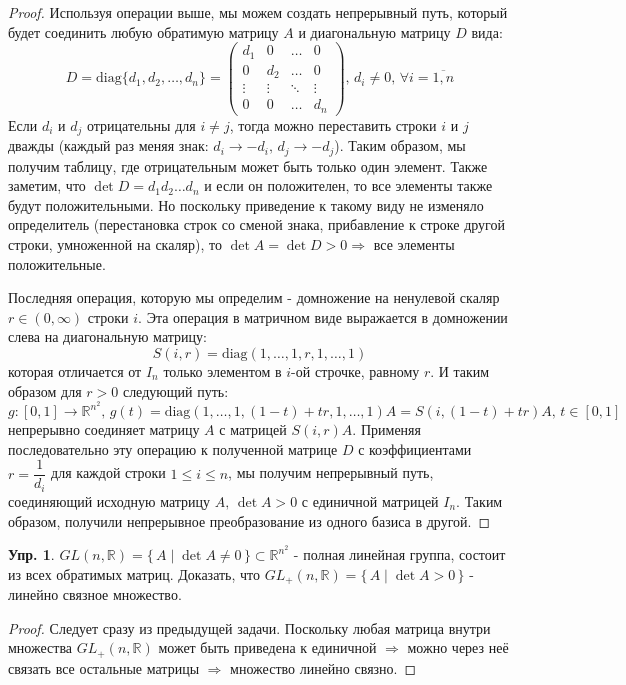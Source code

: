 \documentclass[12pt]{article}
\newcommand{\MR}{\mathbb{R}}
\theoremstyle{definition}
\newtheorem{exrc}{Упр.}
\begin{document}
\begin{proof}
	Используя операции выше, мы можем создать непрерывный путь, который будет соединить любую обратимую матрицу $A$ и диагональную матрицу $D$ вида:
	$$
		D = \text{diag}\{d_1,d_2, \dotsc, d_n\} = 
		\begin{pmatrix}
			d_1 & 0 & \dotsc & 0 \\
			0 & d_2 & \dotsc & 0\\
			\vdots & \vdots & \ddots & \vdots \\
			0 & 0 & \dotsc & d_n
		\end{pmatrix}, \, d_i \neq 0, \, \forall i = \overline{1,n}
	$$
	Если $d_i$ и $d_j$ отрицательны для $i \neq j$, тогда можно переставить строки $i$ и $j$ дважды (каждый раз меняя знак: $d_i \to -d_i, \, d_j \to - d_j$). Таким образом, мы получим таблицу, где отрицательным может быть только один элемент. Также заметим, что $\det{D} = d_1 d_2 \dotsc d_n$ и если он положителен, то все элементы также будут положительными. Но поскольку приведение к такому виду не изменяло определитель (перестановка строк со сменой знака, прибавление к строке другой строки, умноженной на скаляр), то $\det{A} = \det{D} > 0 \Rightarrow$ все элементы положительные.
	
	Последняя операция, которую мы определим - домножение на ненулевой скаляр $r \in (0,\infty)$ строки $i$. Эта операция в матричном виде выражается в домножении слева на диагональную матрицу:
	$$
		S(i,r) = \text{diag}(1,\dotsc,1,r,1,\dotsc,1)
	$$
	которая отличается от $I_n$ только элементом в $i$-ой строчке, равному $r$. И таким образом для $r > 0$ следующий путь:
	$$
		g \colon [0,1] \to \MR^{n^2}, \, g(t) = \text{diag}(1,\dotsc,1,(1-t) + tr,1,\dotsc,1)A = S(i,(1-t) + tr)A, \, t \in [0,1]
	$$
	непрерывно соединяет матрицу $A$ с матрицей $S(i,r)A$. Применяя последовательно эту операцию к полученной матрице $D$ с коэффициентами $r = \dfrac{1}{d_i}$ для каждой строки $1 \leq i \leq n$, мы получим непрерывный путь, соединяющий исходную матрицу $A, \, \det{A} >0$ с единичной матрицей $I_n$. Таким образом, получили непрерывное преобразование из одного базиса в другой.
\end{proof}

\begin{exrc}
	$GL(n,\MR) = \{\,A \mid \det{A} \neq 0 \,\} \subset \MR^{n^2}$ - полная линейная группа, состоит из всех обратимых матриц. Доказать, что $GL_+(n,\MR) = \{\,A \mid \det{A} > 0 \,\}$ - линейно связное множество.
\end{exrc}
\begin{proof}
	Следует сразу из предыдущей задачи. Поскольку любая матрица внутри множества $GL_+(n,\MR)$ может быть приведена к единичной $\Rightarrow$ можно через неё связать все остальные матрицы $\Rightarrow$ множество линейно связно.
\end{proof}
\end{document}
